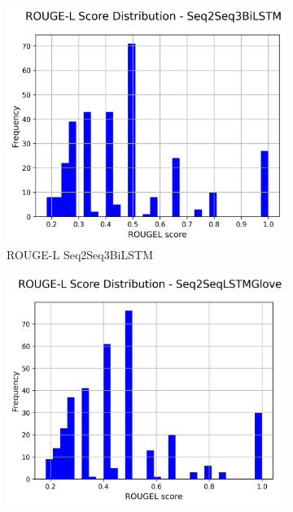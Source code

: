 \begin{figure}[H]
\begin{subfigure}{0.24\textwidth}
    \end{subfigure}
    \hfill
    \begin{subfigure}{0.24\textwidth}
        \centering
        \includegraphics[width=\textwidth]{media/Seq2Seq3BiLSTM_rougeL_scores.png}
        \caption{ROUGE-L Seq2Seq3BiLSTM}
    \end{subfigure}
    \hfill
    \begin{subfigure}{0.24\textwidth}
        \centering
        \includegraphics[width=\textwidth]{media/Seq2SeqLSTMGlove_rougeL_scores.png}

\end{subfigure}
\end{figure}
